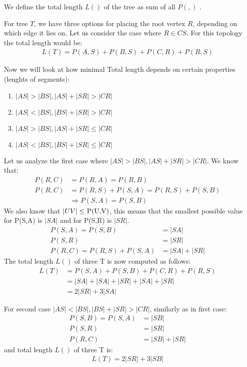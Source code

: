 \documentclass[12pt]{article}
\newcommand{\Prize}[2]{P(#1,#2)}
\begin{document}
	We define the total length \( L() \) of the tree as sum of all $\Prize{}{}$ .
	
	For tree \( T \), we have three options for placing the root vertex \( R \), depending on which edge it lies on. Let us consider the case where \( R \in \overline{CS} \). For this topology the total length would be:
	 \begin{align*}
	 	L(T) = \Prize{A}{S} + \Prize{B}{S} + \Prize{C}{R} + \Prize{R}{S}
	 \end{align*}
	 
	 
	 Now we will look at how minimal Total length depends on certain properties (lenghts of segments): 
	\begin{enumerate}
	\item \( |AS| > |BS|, |AS|+|SR| > |CR| \)
	\item \( |AS| < |BS|, |BS|+|SR| > |CR| \)
	\item \( |AS| > |BS|, |AS|+|SR| \leq |CR| \)
	\item \( |AS| < |BS|, |BS|+|SR| \leq |CR| \)
	\end{enumerate}
	
	
	Let us analyze the first case where \( |AS| > |BS|, |AS|+|SR| > |CR| \).
	We know that:
	\begin{align*}
	\Prize{R}{C} &= \Prize{R}{A} = \Prize{R}{B} \\
	\Prize{R}{C} &= \Prize{R}{S} + \Prize{S}{A} = \Prize{R}{S} + \Prize{S}{B} \\
	&\Rightarrow \Prize{S}{A} = \Prize{S}{B}
	\end{align*}
	We also know that \( |UV| \leq  $ \Prize{U}{V}$ \), this means that the smallest possible value for \Prize{S}{A} is \(|SA|\) and for \Prize{S}{R} is \(|SR|\).
	\begin{align*}	
		\Prize{S}{A} = \Prize{S}{B} &= |SA| \\
		\Prize{S}{R} &= |SR| \\
		\Prize{R}{C} = \Prize{R}{S} + \Prize{S}{A} &= |SA| + |SR|
	\end{align*}
	The total length \( L() \) of three T is now computed as follows:
	\begin{align*}	
		L(T) &= \Prize{S}{A} + \Prize{S}{B} + \Prize{C}{R} + \Prize{R}{S} \\
		&= |SA| + |SA| + |SR| + |SA| + |SR| \\
		&= 2 |SR| + 3 |SA|
	\end{align*}
	
	
	For second case \( |AS| < |BS|, |BS|+|SR| > |CR| \), similarly as in first case:
	\begin{align*}
		\Prize{S}{B} = \Prize{S}{A} &= |SB| \\
		\Prize{S}{R} &= |SR| \\
		\Prize{R}{C} &= |SB| + |SR|
	\end{align*}
		and total length \( L() \) of three T is:
	\begin{align*}	
		L(T) = 2 |SR| + 3 |SB|
	\end{align*}
	
\end{document}
